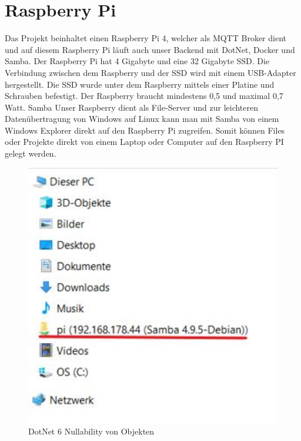 \section{Raspberry Pi}

Das Projekt beinhaltet einen Raspberry Pi 4, welcher als MQTT Broker dient und auf diesem Raspberry Pi läuft auch unser Backend mit DotNet, Docker und Samba.
Der Raspberry Pi hat 4 Gigabyte und eine 32 Gigabyte SSD. 
Die Verbindung zwischen dem Raspberry und der SSD wird mit einem USB-Adapter hergestellt. 
Die SSD wurde unter dem Raspberry mittels einer Platine und Schrauben befestigt. 
Der Raspberry braucht mindestens 0,5 und maximal 0,7 Watt. 
Samba
Unser Raspberry dient als File-Server und zur leichteren Datenübertragung von Windows auf Linux kann man mit Samba von einem Windows Explorer direkt auf den Raspberry Pi zugreifen.
Somit können Files oder Projekte direkt von einem Laptop oder Computer auf den Raspberry PI gelegt werden.

\begin{figure}[H]
    \centering
    \includegraphics[width=1\textwidth]{pics/RaspberrySamba.JPG}
    \caption{DotNet 6 Nullability von Objekten}
\end{figure}



